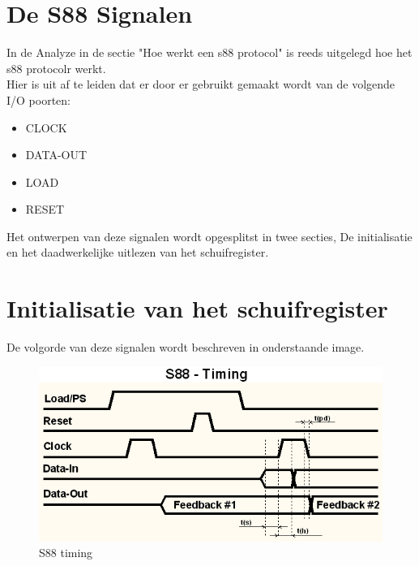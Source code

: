 	\section{De S88 Signalen}

In de Analyze in de sectie "Hoe werkt een s88 protocol" is reeds uitgelegd hoe het s88 protocolr werkt. 
\\
Hier is uit af te leiden dat er door er gebruikt gemaakt wordt van de volgende I/O poorten:

\begin{itemize}
	\item CLOCK
	\item DATA-OUT
	\item LOAD
	\item RESET
\end{itemize}

Het ontwerpen van deze signalen wordt opgesplitst in twee secties, De initialisatie en het daadwerkelijke uitlezen van het schuifregister.

\section{Initialisatie van het schuifregister}


De volgorde van deze signalen wordt beschreven in onderstaande image.
\begin{figure}
	\includegraphics[scale=0.9]{./img/s88timing.png}
	\caption{S88 timing}
\end{figure}


